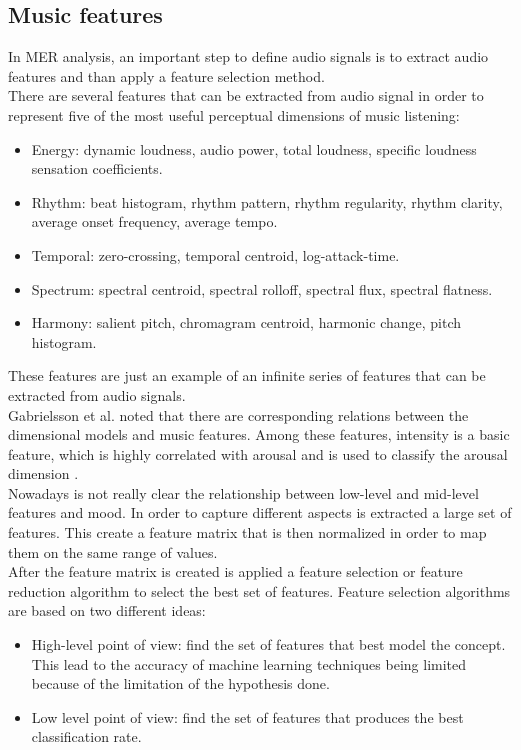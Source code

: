 \subsection{Music features}
In MER analysis, an important step to define audio signals is to extract audio features and than apply a feature selection method.
\\
There are several features that can be extracted from audio signal in order to represent five of the most useful perceptual dimensions of music listening:
\begin{itemize}
	\item Energy: dynamic loudness, audio power, total loudness, specific loudness sensation coefficients.
	\item Rhythm: beat histogram, rhythm pattern, rhythm regularity, rhythm clarity, average onset frequency, average tempo.
	\item Temporal: zero-crossing, temporal centroid, log-attack-time.
	\item Spectrum: spectral centroid, spectral rolloff, spectral flux, spectral flatness.
	\item Harmony: salient pitch, chromagram centroid, harmonic change, pitch histogram.
\end{itemize}
These features are just an example of an infinite series of features that can be extracted from audio signals.
\\ \indent
Gabrielsson et al. \cite{gabrielsson2001influence} noted that there are corresponding relations between the dimensional models and music features. Among these features, intensity is a basic feature, which is highly correlated with arousal and is used to classify the arousal dimension \cite{zhang2017feature}.
\\
Nowadays is not really clear the relationship between low-level and mid-level features and mood. In order to capture different aspects is extracted a large set of features. This create a feature matrix that is then normalized in order to map them on the same range of values.
\\ \indent
After the feature matrix is created is applied a feature selection or feature reduction algorithm to select the best set of features. Feature selection algorithms are based on two different ideas:
\begin{itemize}
	\item High-level point of view: find the set of features that best model the concept. This lead to the accuracy of machine learning techniques being limited because of the limitation of the hypothesis done.
	\item Low level point of view: find the set of features that produces the best classification rate.
\end{itemize}
